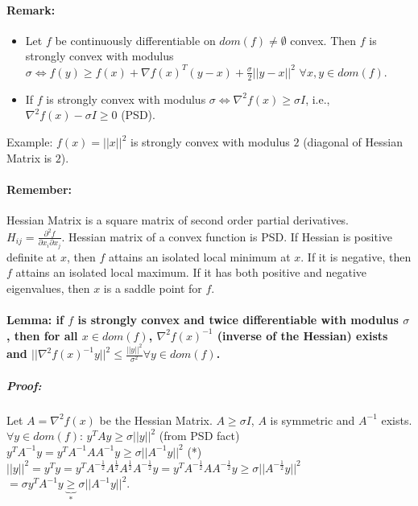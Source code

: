\documentclass[main]{subfiles}
\begin{document}
\paragraph{Remark:}
\begin{itemize}
\item Let $f$ be continuously differentiable on $dom(f) \neq
\emptyset$ convex. Then $f$ is strongly convex with modulus $\sigma \iff f(y)
\geq f(x) + \nabla f(x)^T (y-x) + \frac{\sigma}{2} ||y-x||^2$ $\forall x, y
\in dom(f)$.
\item If $f$ is strongly convex with modulus $\sigma \iff \nabla^2 f(x) \geq
\sigma I$, i.e., $\nabla^2 f(x) - \sigma I \geq 0$ (PSD).
\end{itemize}
Example: $f(x) = ||x||^2$ is strongly convex with modulus $2$ (diagonal of
Hessian Matrix is $2$).

\paragraph{Remember:}
Hessian Matrix is a square matrix of second order partial derivatives.\\
$H_{ij} = \frac{\partial^2 f}{\partial x_i \partial x_j}$.
Hessian matrix of a convex function is PSD. If Hessian is positive definite at
$x$, then $f$ attains an isolated local minimum at $x$. If it is negative, then
$f$ attains an isolated local maximum. If it has both positive and negative
eigenvalues, then $x$ is a saddle point for $f$.

\paragraph{Lemma: if $f$ is strongly convex and twice differentiable with
modulus $\sigma$, then for all $x \in dom(f)$,
$\nabla^2 f(x)^{-1}$ (inverse of the Hessian) exists and
$||\nabla^2 f(x)^{-1} y||^2 \leq \frac{||y||^2}{ \sigma^2}
\forall y \in dom(f)$.}

\subparagraph{Proof:}
Let $A = \nabla^2 f(x)$ be the Hessian Matrix. $A \geq \sigma I$, $A$ is
symmetric and $A^{-1}$ exists.\\
$\forall y \in dom(f)$: $y^T Ay \geq \sigma ||y||^2$ (from PSD fact)\\
$y^T A^{-1}y = y^T A^{-1}A A^{-1}y \geq \sigma ||A^{-1}y||^2$ (*)\\
$||y||^2 = y^Ty = y^T A^{-\frac{1}{2}}A^{\frac{1}{2}}A^{\frac{1}{2}}
A^{-\frac{1}{2}} y = y^T A^{-\frac{1}{2}} A A^{-\frac{1}{2}}y \geq
\sigma ||A^{-\frac{1}{2}}y||^2$\\
$= \sigma y^T A^{-1}y \underbrace{\geq}_{*} \sigma ||A^{-1}y||^2$.
\end{document}
